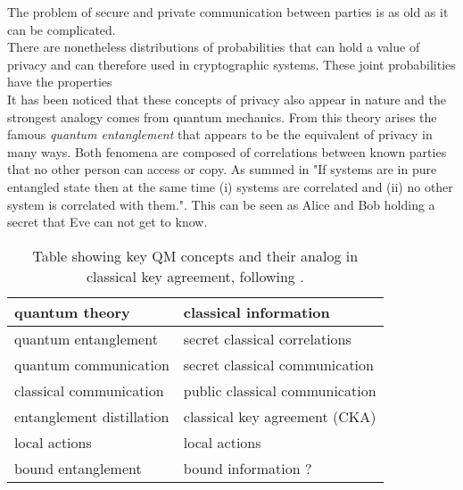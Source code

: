 
The problem of secure and private communication between parties is as old as it can be complicated. 
\\

There are nonetheless distributions of probabilities that can hold a value of privacy and can therefore used in cryptographic systems. These joint probabilities have the properties
\\

It has been noticed that these concepts of privacy also appear in nature and the strongest analogy comes from quantum mechanics.\footnotemark 
From this theory arises the famous \emph{quantum entanglement} that appears to be the equivalent of privacy in many ways.
Both fenomena are composed of correlations between known parties that no other person can access or copy. As summed in \cite{4H07} "If systems are in pure entangled state then at the same time (i) systems are correlated and (ii) no other system is correlated with them.". 
This can be seen as Alice and Bob holding a secret that Eve can not get to know.
\begin{table}[h]
	 \centering
	 	\begin{tabular}{ l | l}
	 		\textbf{quantum theory} & \textbf{classical information} \\ 
	 		\hline 
	 		quantum entanglement & secret classical correlations \\ 
	 		quantum communication & secret classical communication \\ 
	 		classical communication & public classical communication \\ 
	 		entanglement distillation & classical key agreement (CKA) \\ %
	 		local actions & local actions \\ 
	 		bound entanglement & bound information ? \\
	 	\end{tabular} 
	 	\caption{Table showing key QM concepts and their analog in classical key agreement, following \cite{CP02}.
	 	\label{Tab:analogy}}
	 \end{table}
\\

